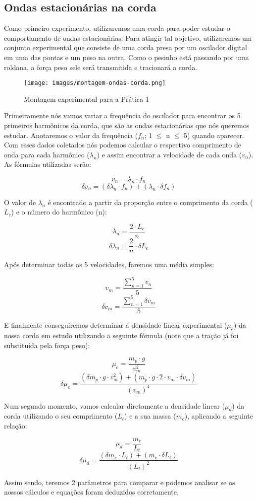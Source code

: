 \subsection{Ondas estacionárias na corda}

Como primeiro experimento, utilizaremos uma corda para poder estudar o comportamento de ondas estacionárias. Para atingir tal objetivo, utilizaremos um conjunto experimental que consiste de uma corda presa por um oscilador digital em uma das pontas e um peso na outra. Como o pesinho está passando por uma roldana, a força peso sele será transmitida e tracionará a corda.

\begin{figure}[H]
    \centering
    \texttt{[image: images/montagem-ondas-corda.png]}
    \caption{Montagem experimental para a Prática 1}
\end{figure}

Primeiramente nós vamos variar a frequência do oscilador para encontrar os 5 primeiros harmônicos da corda, que são as ondas estacionárias que nós queremos estudar. Anotaremos o valor da frequência ($f_n$; 1 $\leq$ n $\leq$ 5) quando aparecer. Com esses dados coletados nós podemos calcular o respectivo comprimento de onda para cada harmônico ($\lambda_n$) e assim encontrar a velocidade de cada onda ($v_n$). As fórmulas utilizadas serão:

\[ v_n = \lambda_n \cdot f_n \]
\[ \delta v_n = (\delta \lambda_n \cdot f_n) + (\lambda_n \cdot \delta f_n) \]

O valor de $\lambda_n$ é encontrado a partir da proporção entre o comprimento da corda ($L_c$) e o número do harmônico (n):

\[ \lambda_n = \frac{2 \cdot L_c}{n} \]
\[ \delta \lambda_n = \frac{2}{n} \cdot \delta L_c \]

Após determinar todas as 5 velocidades, faremos uma média simples:

\[ v_m = \frac{\sum_{n=1}^{5} v_n}{5} \]
\[ \delta v_m = \frac{\sum_{n=1}^{5} \delta v_m}{5} \]

E finalmente conseguiremos determinar a densidade linear experimental ($\mu_e$) da nossa corda em estudo utilizando a seguinte fórmula (note que a tração já foi substituída pela força peso):

\[ \mu_e = \frac{m_p \cdot g}{v_m^2} \]
\[ \delta \mu_e = \frac{(\delta m_p \cdot g \cdot v_m^2) + (m_p \cdot g \cdot 2 \cdot v_m \cdot \delta v_m)}{(v_m)^4} \]

Num segundo momento, vamos calcular diretamente a densidade linear ($\mu_d$) da corda utilizando o seu comprimento ($L_t$) e a sua massa ($m_c$), aplicando a seguinte relação:

\[ \mu_d = \frac{m_c}{L_t} \]
\[ \delta \mu_d = \frac{(\delta m_c \cdot L_t) + (m_c \cdot \delta L_t)}{(L_t)^2} \]

Assim sendo, teremos 2 parâmetros para comparar e podemos analisar se os nossos cálculos e equações foram deduzidos corretamente.
